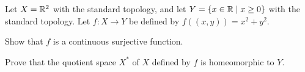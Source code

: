 \begin{comment}
\item Reflect the bottom figure about the $c$-axis. Then reflect the top figure about its $c$-axis, and reflect again around its $b$-axis. Finally translate the two figures so that their $c$-axes coincide. This provides the homeomorphism $f$. The homeomorphism $g$ is the identification mapping which identifies the two segments $a$ and the two segments $b$. The mapping $g$ also rotates the identified segments $a$ and $b$ to align them with segment $c$, then stretches segments $x$ and $y$ to semicircles. The result is that $S$ is homeomorphic to a disk. Notice that the boundary of the disk matches the boundary of the M{\"o}bius strip that was removed. So if we sew the M{\"o}bius strip on to the disk along the boundary, we will return to $\mathbb{R}P^2$. 

\ea

\end{comment}

\item Let $X = \mathbb{R}^2$ with the standard topology, and let $Y = \{x \in \mathbb{R} \mid x \geq 0\}$ with the standard topology. Let $f: X \to Y$ be defined by $f((x,y)) = x^2+y^2$. 
\ba
\item Show that $f$ is a continuous surjective function.

\item Prove that the quotient space $X^{*}$ of $X$ defined by $f$ is homeomorphic to $Y$.

\ea


